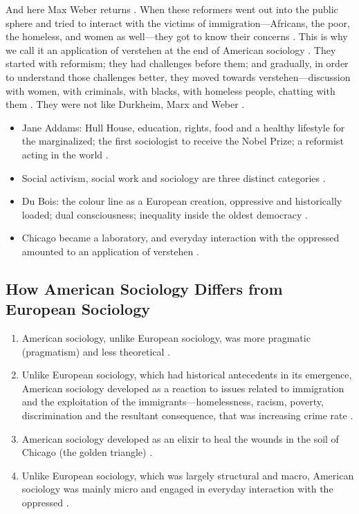 And here Max Weber returns . When these reformers went out into the public sphere and tried to interact with the victims of immigration---Africans, the poor, the homeless, and women as well---they got to know their concerns . This is why we call it an application of verstehen at the end of American sociology .
They started with reformism; they had challenges before them; and gradually, in order to understand those challenges better, they moved towards verstehen---discussion with women, with criminals, with blacks, with homeless people, chatting with them . They were not like Durkheim, Marx and Weber .

\begin{QuickRevision}
\begin{itemize}
    \item Jane Addams: Hull House, education, rights, food and a healthy lifestyle for the marginalized; the first sociologist to receive the Nobel Prize; a reformist acting in the world .
    \item Social activism, social work and sociology are three distinct categories .
    \item Du Bois: the colour line as a European creation, oppressive and historically loaded; dual consciousness; inequality inside the oldest democracy .
    \item Chicago became a laboratory, and everyday interaction with the oppressed amounted to an application of verstehen .
\end{itemize}
\end{QuickRevision}

\subsection{How American Sociology Differs from European Sociology}
\begin{enumerate}
    \item American sociology, unlike European sociology, was more pragmatic (pragmatism) and less theoretical .
    \item Unlike European sociology, which had historical antecedents in its emergence, American sociology developed as a reaction to issues related to immigration and the exploitation of the immigrants---homelessness, racism, poverty, discrimination and the resultant consequence, that was increasing crime rate .
    \item American sociology developed as an elixir to heal the wounds in the soil of Chicago (the golden triangle) .
    \item Unlike European sociology, which was largely structural and macro, American sociology was mainly micro and engaged in everyday interaction with the oppressed .
\end{enumerate}

